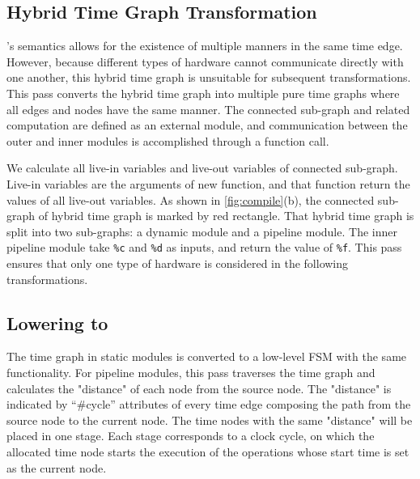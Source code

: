 
\subsection{Hybrid Time Graph Transformation}
\label{sec:split}
\tor's semantics allows for the existence of multiple manners in the same time edge. However, because different types of hardware cannot communicate directly with one another, this hybrid time graph is unsuitable for subsequent transformations. This pass converts the hybrid time graph into multiple pure time graphs where all edges and nodes have the same manner. The connected sub-graph and related computation are defined as an external module, and communication between the outer and inner modules is accomplished through a function call. 

We calculate all live-in variables and live-out variables of connected sub-graph. Live-in variables are the arguments of new function, and that function return the values of all live-out variables. As shown in \autoref{fig:compile}(b), the connected sub-graph of hybrid time graph is marked by red rectangle. That hybrid time graph is split into two sub-graphs: a dynamic module and a pipeline module. The inner pipeline module take \verb|%c| and \verb|%d| as inputs, and return the value of \verb|%f|. This pass ensures that only one type of hardware is considered in the following transformations. 


\subsection{Lowering \tor to \hec}
\label{sec:lower}
The time graph in static modules is converted to a low-level FSM with the same functionality. For pipeline \tor modules, this pass traverses the time graph and calculates the "distance" of each node from the source node. The "distance" is indicated by “\#cycle” attributes of every time edge composing the path from the source node to the current node. The time nodes with the same "distance" will be placed in one stage. Each stage corresponds to a clock cycle, on which the allocated time node starts the execution of the operations whose start time is set as the current node. 

